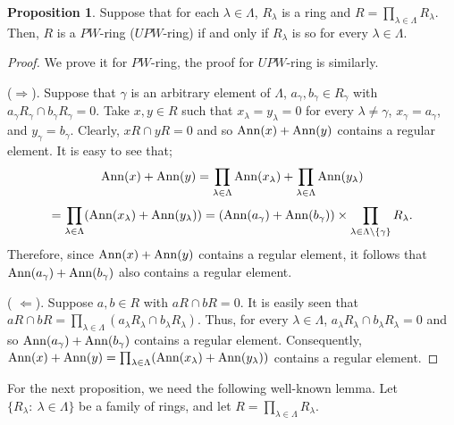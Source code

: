 \documentclass{amsart}
\theoremstyle{definition}
\theoremstyle{remark}
\numberwithin{equation}{section}
\newcommand{\Ann}{{\rm Ann}}
\newcommand{\la}{\lambda}
\newcommand{\La}{\Lambda}
\newcommand{\ga}{\gamma}
\newcommand{\RTA}{\Rightarrow}
\newcommand{\LTA}{\Leftarrow}
\def\set {\setminus }
\def\RTA {\Rightarrow }
\def\LTA {\Leftarrow }
\theoremstyle{definition}\newtheorem{thm}{Theorem}[section]
\theoremstyle{definition}\newtheorem{cor}[thm]{Corollary}
\theoremstyle{definition}\newtheorem{lem}[thm]{Lemma}
\theoremstyle{definition}\newtheorem{prop}[thm]{Proposition}
\theoremstyle{definition}\newtheorem{defn}[thm]{Definition}
\theoremstyle{definition}\newtheorem{Rem}[thm]{Remark}
\theoremstyle{remark}\newtheorem{rem}[thm]{Remark}
\theoremstyle{definition}\newtheorem{exam}[thm]{Example}
\theoremstyle{definition}\newtheorem{qu}[thm]{question}
\begin{document}
\begin{prop}\label{has}
Suppose that for each $\la\in \La$, $R_\la$ is a ring and $R=\prod_{\la\in\La}R_\la$. Then, $R$ is a $PW$-ring ($UPW$-ring) if and only if $R_\la$ is so for every $\la\in\La$.
\end{prop}
\begin{proof}
We prove it for $PW$-ring, the proof for $UPW$-ring is similarly. 

($\RTA$).  Suppose that $\ga$ is an arbitrary element of $\La$, $a_\ga,b_\ga\in R_\ga$ with $a_\ga R_\ga\cap b_\ga R_\ga=0$. Take $x,y\in R$ such that $x_\la=y_\la=0$ for every $\la\neq\ga$, $x_\ga=a_\ga$, and $y_\ga=b_\ga$. Clearly, $xR\cap yR=0$ and so $\Ann(x)+\Ann(y)$ contains a regular element. It is easy to see that; 
$$\Ann(x)+\Ann(y)=\prod_{\la\in\La}\Ann(x_\la)+\prod_{\la\in\La}\Ann(y_\la)$$
$$=\prod_{\la\in\La}(\Ann(x_\la)+\Ann(y_\la))=(\Ann(a_\ga)+\Ann(b_\ga))\times\prod_{\la\in\La\set\{\ga\}}R_\la.$$
Therefore, since $\Ann(x)+\Ann(y)$ contains a regular element, it follows that $\Ann(a_\ga)+\Ann(b_\ga)$ also contains  a regular element.

( $\LTA$). Suppose $a,b\in R$ with $aR\cap bR=0$. It is easily seen that $aR\cap bR=\prod_{\la\in\La}(a_\la R_\la\cap b_\la R_\la)$. Thus, for every $\la\in\La$, $a_\la R_\la\cap b_\la R_\la=0$ and so $\Ann(a_\ga)+\Ann(b_\ga)$ contains a regular element. Consequently, $\Ann(x)+\Ann(y)=\prod_{\la\in\La}(\Ann(x_\la)+\Ann(y_\la))$ contains a regular element.
\end{proof}
\vspace{3mm}
For the next proposition, we need the following well-known lemma. Let $\{R_\lambda:~\lambda \in \Lambda\}$ be a family of rings, and let $R = \prod_{\lambda \in \Lambda} R_\lambda$.
\end{document}
